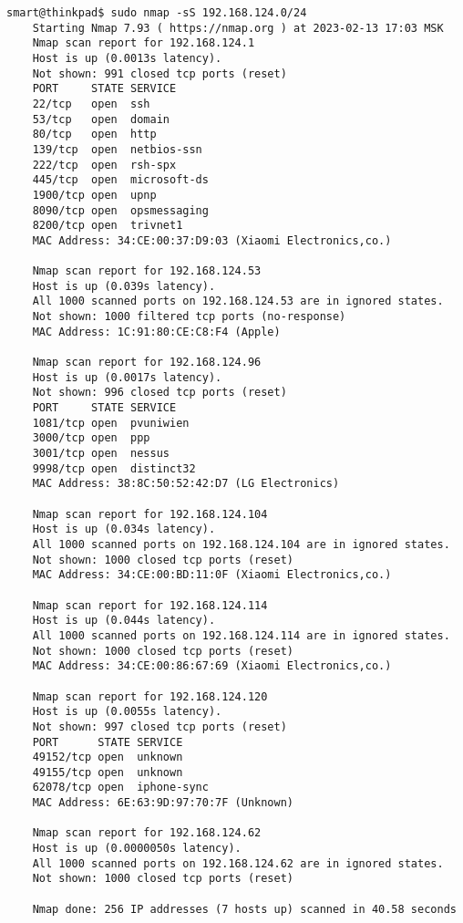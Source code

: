 \begin{Verbatim}[frame=single]
    smart@thinkpad$ sudo nmap -sS 192.168.124.0/24
    Starting Nmap 7.93 ( https://nmap.org ) at 2023-02-13 17:03 MSK
    Nmap scan report for 192.168.124.1
    Host is up (0.0013s latency).
    Not shown: 991 closed tcp ports (reset)
    PORT     STATE SERVICE
    22/tcp   open  ssh
    53/tcp   open  domain
    80/tcp   open  http
    139/tcp  open  netbios-ssn
    222/tcp  open  rsh-spx
    445/tcp  open  microsoft-ds
    1900/tcp open  upnp
    8090/tcp open  opsmessaging
    8200/tcp open  trivnet1
    MAC Address: 34:CE:00:37:D9:03 (Xiaomi Electronics,co.)

    Nmap scan report for 192.168.124.53
    Host is up (0.039s latency).
    All 1000 scanned ports on 192.168.124.53 are in ignored states.
    Not shown: 1000 filtered tcp ports (no-response)
    MAC Address: 1C:91:80:CE:C8:F4 (Apple)

    Nmap scan report for 192.168.124.96
    Host is up (0.0017s latency).
    Not shown: 996 closed tcp ports (reset)
    PORT     STATE SERVICE
    1081/tcp open  pvuniwien
    3000/tcp open  ppp
    3001/tcp open  nessus
    9998/tcp open  distinct32
    MAC Address: 38:8C:50:52:42:D7 (LG Electronics)

    Nmap scan report for 192.168.124.104
    Host is up (0.034s latency).
    All 1000 scanned ports on 192.168.124.104 are in ignored states.
    Not shown: 1000 closed tcp ports (reset)
    MAC Address: 34:CE:00:BD:11:0F (Xiaomi Electronics,co.)

    Nmap scan report for 192.168.124.114
    Host is up (0.044s latency).
    All 1000 scanned ports on 192.168.124.114 are in ignored states.
    Not shown: 1000 closed tcp ports (reset)
    MAC Address: 34:CE:00:86:67:69 (Xiaomi Electronics,co.)

    Nmap scan report for 192.168.124.120
    Host is up (0.0055s latency).
    Not shown: 997 closed tcp ports (reset)
    PORT      STATE SERVICE
    49152/tcp open  unknown
    49155/tcp open  unknown
    62078/tcp open  iphone-sync
    MAC Address: 6E:63:9D:97:70:7F (Unknown)

    Nmap scan report for 192.168.124.62
    Host is up (0.0000050s latency).
    All 1000 scanned ports on 192.168.124.62 are in ignored states.
    Not shown: 1000 closed tcp ports (reset)

    Nmap done: 256 IP addresses (7 hosts up) scanned in 40.58 seconds
\end{Verbatim}

